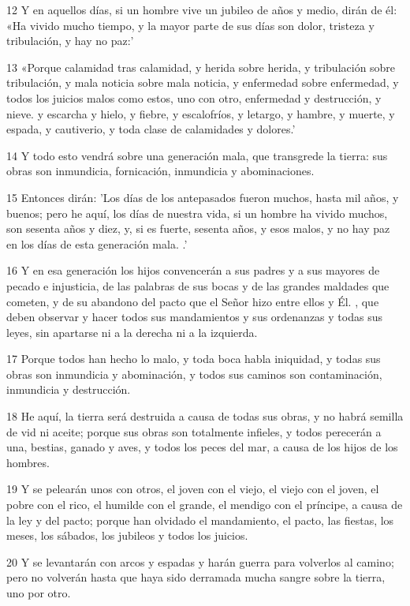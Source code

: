 \par 12 Y en aquellos días, si un hombre vive un jubileo de años y medio, dirán de él: «Ha vivido mucho tiempo, y la mayor parte de sus días son dolor, tristeza y tribulación, y hay no paz:'
\par 13 «Porque calamidad tras calamidad, y herida sobre herida, y tribulación sobre tribulación, y mala noticia sobre mala noticia, y enfermedad sobre enfermedad, y todos los juicios malos como estos, uno con otro, enfermedad y destrucción, y nieve. y escarcha y hielo, y fiebre, y escalofríos, y letargo, y hambre, y muerte, y espada, y cautiverio, y toda clase de calamidades y dolores.'
\par 14 Y todo esto vendrá sobre una generación mala, que transgrede la tierra: sus obras son inmundicia, fornicación, inmundicia y abominaciones.
\par 15 Entonces dirán: 'Los días de los antepasados ​​fueron muchos, hasta mil años, y buenos; pero he aquí, los días de nuestra vida, si un hombre ha vivido muchos, son sesenta años y diez, y, si es fuerte, sesenta años, y esos malos, y no hay paz en los días de esta generación mala. .'
\par 16 Y en esa generación los hijos convencerán a sus padres y a sus mayores de pecado e injusticia, de las palabras de sus bocas y de las grandes maldades que cometen, y de su abandono del pacto que el Señor hizo entre ellos y Él. , que deben observar y hacer todos sus mandamientos y sus ordenanzas y todas sus leyes, sin apartarse ni a la derecha ni a la izquierda.
\par 17 Porque todos han hecho lo malo, y toda boca habla iniquidad, y todas sus obras son inmundicia y abominación, y todos sus caminos son contaminación, inmundicia y destrucción.
\par 18 He aquí, la tierra será destruida a causa de todas sus obras, y no habrá semilla de vid ni aceite; porque sus obras son totalmente infieles, y todos perecerán a una, bestias, ganado y aves, y todos los peces del mar, a causa de los hijos de los hombres.
\par 19 Y se pelearán unos con otros, el joven con el viejo, el viejo con el joven, el pobre con el rico, el humilde con el grande, el mendigo con el príncipe, a causa de la ley y del pacto; porque han olvidado el mandamiento, el pacto, las fiestas, los meses, los sábados, los jubileos y todos los juicios.
\par 20 Y se levantarán con arcos y espadas y harán guerra para volverlos al camino; pero no volverán hasta que haya sido derramada mucha sangre sobre la tierra, uno por otro.
